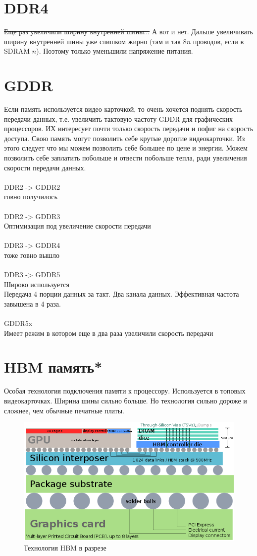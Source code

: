 \documentclass[12pt, a4paper]{article}
\begin{document}
\section{DDR4}
\sout{Еще раз увеличили ширину внутренней шины...} А вот и нет. Дальше увеличивать ширину внутренней шины уже слишком жирно (там и так $8n$ проводов, если в SDRAM $n$). Поэтому только уменьшили напряжение питания.\\
\section{GDDR}
Если память используется видео карточкой, то очень хочется поднять скорость передачи данных, т.е. увеличить тактовую частоту
GDDR для графических процессоров. ИХ интересует почти только скорость передачи и пофиг на скорость доступа. Свою память могут позволить себе крутые дорогие видеокарточки. Из этого следует что мы можем позволить себе большее по цене и энергии. Можем позволить себе заплатить побольше и отвести побольше тепла, ради увеличения скорости передачи данных. \\
\\
DDR2 -> GDDR2\\
говно получилось\\
\\
DDR2 -> GDDR3\\
Оптимизация под увеличение скорости передачи\\
\\
DDR3 -> GDDR4\\
тоже говно вышло\\
\\
DDR3 -> GDDR5\\
Широко используется\\
Передача 4 порции данных за такт. Два канала данных. Эффективная частота завышена в 4 раза.\\
\\
GDDR5x\\
Имеет режим в котором еще в два раза увеличили скорость передачи
\section{HBM память*}
Особая технология подключения памяти к процессору. Используется в топовых видеокарточках. Ширина шины сильно больше. Но технология сильно дороже и сложнее, чем обычные печатные платы.
\begin{figure}[h!]
    \centering
    \includegraphics[scale=0.4]{./images/HBM.png}
    \caption{Технология HBM в разрезе}
    \label{fig:HBM}
\end{figure}
\end{document}
